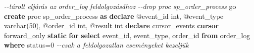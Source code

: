 \documentclass[
  magyar,
]{article}
\newenvironment{Shaded}{}{}
\newcommand{\CommentTok}[1]{\textcolor[rgb]{0.38,0.63,0.69}{\textit{#1}}}
\newcommand{\ControlFlowTok}[1]{\textcolor[rgb]{0.00,0.44,0.13}{\textbf{#1}}}
\newcommand{\DataTypeTok}[1]{\textcolor[rgb]{0.56,0.13,0.00}{#1}}
\newcommand{\DecValTok}[1]{\textcolor[rgb]{0.25,0.63,0.44}{#1}}
\newcommand{\KeywordTok}[1]{\textcolor[rgb]{0.00,0.44,0.13}{\textbf{#1}}}
\newcommand{\NormalTok}[1]{#1}
\newcommand{\OperatorTok}[1]{\textcolor[rgb]{0.40,0.40,0.40}{#1}}
\begin{document}
\begin{Shaded}
\begin{Highlighting}[]
\CommentTok{{-}{-}tárolt eljárás az order\_log feldolgozásához}
\CommentTok{{-}{-}drop proc sp\_order\_process}
\NormalTok{go}
\KeywordTok{create}\NormalTok{ proc sp\_order\_process }\KeywordTok{as}
\KeywordTok{declare}\NormalTok{ @event\_id }\DataTypeTok{int}\NormalTok{, @event\_type }\DataTypeTok{varchar}\NormalTok{(}\DecValTok{50}\NormalTok{), @order\_id }\DataTypeTok{int}\NormalTok{, @result }\DataTypeTok{int}
\KeywordTok{declare}\NormalTok{ cursor\_events }\KeywordTok{cursor}\NormalTok{ forward\_only }\KeywordTok{static}
    \ControlFlowTok{for}
    \KeywordTok{select}\NormalTok{  event\_id, event\_type, order\_id}
    \KeywordTok{from}\NormalTok{ order\_log }\KeywordTok{where}\NormalTok{ status}\OperatorTok{=}\DecValTok{0}  \CommentTok{{-}{-}csak a feldolgozatlan eseményeket kezeljük}


\end{Highlighting}
\end{Shaded}
\end{document}
